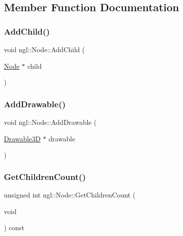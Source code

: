\subsection{Member Function Documentation}
\mbox{\label{classngl_1_1_node_a70703f8c1af37972b898c1b0d84f91fb}} 
\subsubsection{\texorpdfstring{Add\+Child()}{AddChild()}}
{\footnotesize\ttfamily void ngl\+::\+Node\+::\+Add\+Child (\begin{DoxyParamCaption}\item[{\mbox{\hyperlink{classngl_1_1_node}{Node}} $\ast$}]{child }\end{DoxyParamCaption})}

\mbox{\label{classngl_1_1_node_a92edb6c8179496fd3e3977fa2a3dd6a3}} 
\subsubsection{\texorpdfstring{Add\+Drawable()}{AddDrawable()}}
{\footnotesize\ttfamily void ngl\+::\+Node\+::\+Add\+Drawable (\begin{DoxyParamCaption}\item[{\mbox{\hyperlink{classngl_1_1_drawable3_d}{Drawable3D}} $\ast$}]{drawable }\end{DoxyParamCaption})}

\mbox{\label{classngl_1_1_node_ad6eb66f2c3c583cb83b35724fa72fc1c}} 
\subsubsection{\texorpdfstring{Get\+Children\+Count()}{GetChildrenCount()}}
{\footnotesize\ttfamily unsigned int ngl\+::\+Node\+::\+Get\+Children\+Count (\begin{DoxyParamCaption}\item[{void}]{ }\end{DoxyParamCaption}) const}

